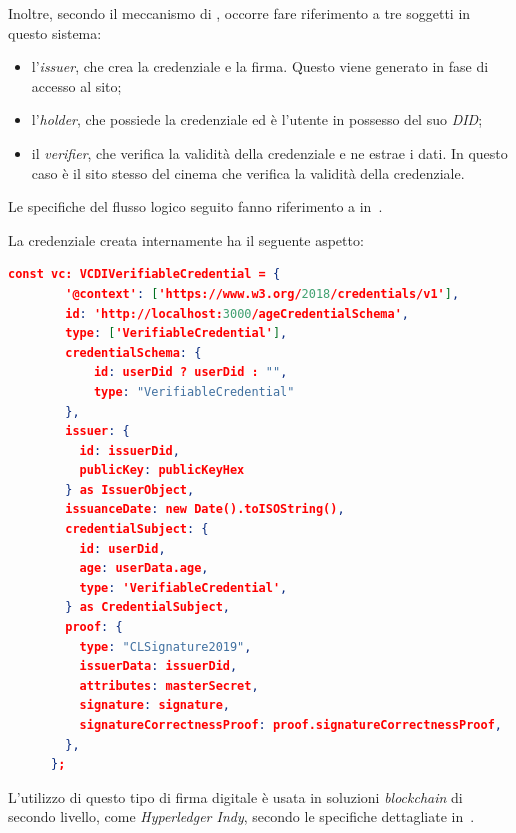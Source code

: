 Inoltre, secondo il meccanismo di , occorre fare riferimento a tre soggetti in questo sistema:
\begin{itemize}
    \item l'\textit{issuer}, che crea la credenziale e la firma. Questo viene generato in fase di accesso al sito;
    \item l'\textit{holder}, che possiede la credenziale ed è l'utente in possesso del suo \textit{DID};
    \item il \textit{verifier}, che verifica la validità della credenziale e ne estrae i dati. In questo caso è il sito stesso del cinema che verifica la validità della credenziale.
\end{itemize}

Le specifiche del flusso logico seguito fanno riferimento a in~\cite{site:clsignature2}.

La credenziale creata internamente ha il seguente aspetto:
\begin{lstlisting}[language=json]
    const vc: VCDIVerifiableCredential = {
        '@context': ['https://www.w3.org/2018/credentials/v1'],
        id: 'http://localhost:3000/ageCredentialSchema',
        type: ['VerifiableCredential'],
        credentialSchema: { 
            id: userDid ? userDid : "",
            type: "VerifiableCredential"
        },        
        issuer: {
          id: issuerDid,
          publicKey: publicKeyHex 
        } as IssuerObject,
        issuanceDate: new Date().toISOString(),
        credentialSubject: {
          id: userDid,
          age: userData.age,
          type: 'VerifiableCredential',
        } as CredentialSubject,
        proof: {
          type: "CLSignature2019", 
          issuerData: issuerDid, 
          attributes: masterSecret,
          signature: signature,
          signatureCorrectnessProof: proof.signatureCorrectnessProof,
        },
      };
\end{lstlisting}
L'utilizzo di questo tipo di firma digitale è usata in soluzioni \textit{blockchain} di secondo livello, come \textit{Hyperledger Indy}, 
secondo le specifiche dettagliate in~\cite{site:clsignature}. \\


